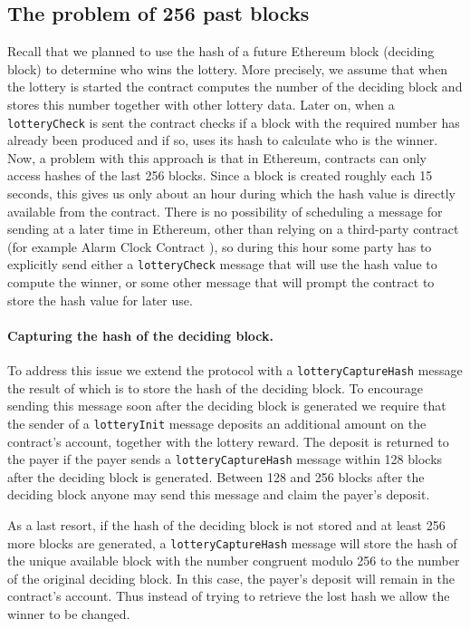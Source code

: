 \documentclass[a4paper]{article}
\begin{document}
\subsection{The problem of 256 past blocks}
    \label{sec:problem256}
    Recall that we planned to use the hash of a future Ethereum block (deciding block) to determine who wins
    the lottery. More precisely, we assume that when the lottery is started the contract computes the number
    of the deciding block and stores this number together with other lottery data. Later on, when a
    \texttt{lotteryCheck} is sent the contract checks if a block with the required number has already been
    produced and if so, uses its hash to calculate who is the winner. Now, a problem with this approach is that in
    Ethereum, contracts can only access hashes of the last 256 blocks. Since a block is created roughly each 15
    seconds, this gives us only about an hour during which the hash value is directly available from the contract.
    There is no possibility of scheduling a message for sending at a later time in Ethereum, other than relying on
    a third-party contract (for example Alarm Clock Contract \cite{ALARM}), so during this hour some party has
    to explicitly send either a \texttt{lotteryCheck} message that will use the hash value to compute the winner,
    or some other message that will prompt the contract to store the hash value for later use.

    \paragraph{Capturing the hash of the deciding block.}

    To address this issue we extend the protocol with a \texttt{lotteryCaptureHash} message the result of which is to
    store the hash of the deciding block. To encourage sending this message soon after the deciding block is generated
    we require that the sender of a \texttt{lotteryInit} message deposits an additional amount on the contract's
    account, together with the lottery reward. The deposit is returned to the payer if the payer sends a
    \texttt{lotteryCaptureHash} message within 128 blocks after the deciding block is generated.
    Between 128 and 256 blocks after the deciding block anyone may send this message and claim the payer's deposit.

    As a last resort, if the hash of the deciding block is not stored and at least 256 more blocks are generated,
    a \texttt{lotteryCaptureHash} message will store the hash of the unique available block with the number congruent
    modulo 256 to the number of the original deciding block. In this case, the payer's deposit will remain in the
    contract's account. Thus instead of trying to retrieve the lost hash we allow the winner to be changed.
\end{document}
